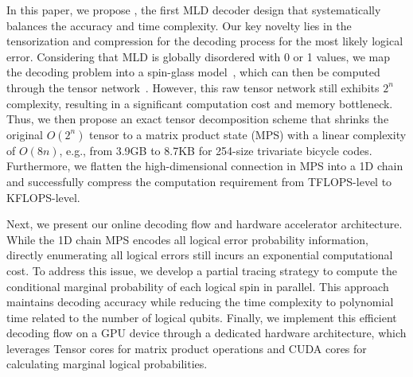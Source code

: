 

In this paper, we propose \papername, the first MLD decoder design that systematically balances the accuracy and time complexity. Our key novelty lies in the tensorization and compression for the decoding process for the most likely logical error. Considering that MLD is globally disordered with 0 or 1 values, we map the decoding problem into a spin-glass model~\cite{jaddi2020ldpc,kovalev2015spin}, which can then be computed through the tensor network~\cite {orus2019tensor,montangero2018introduction}. However, this raw tensor network still exhibits $2^n$ complexity, resulting in a significant computation cost and memory bottleneck. Thus, we then propose an exact tensor decomposition scheme that shrinks the original $O(2^n)$ tensor to a matrix product state (MPS) with a linear complexity of $O(8n)$, e.g., from 3.9GB to 8.7KB for 254-size trivariate bicycle codes. Furthermore, we flatten the high-dimensional connection in MPS into a 1D chain and successfully compress the computation requirement from TFLOPS-level to KFLOPS-level.

Next, we present our online decoding flow and hardware accelerator architecture. 
While the 1D chain MPS encodes all logical error probability information, directly enumerating all logical errors still incurs an exponential computational cost. To address this issue, we develop a partial tracing strategy to compute the conditional marginal probability of each logical spin in parallel. This approach maintains decoding accuracy while reducing the time complexity to polynomial time related to the number of logical qubits. Finally, we implement this efficient decoding flow on a GPU device through a dedicated hardware architecture, which leverages Tensor cores for matrix product operations and CUDA cores for calculating marginal logical probabilities.


